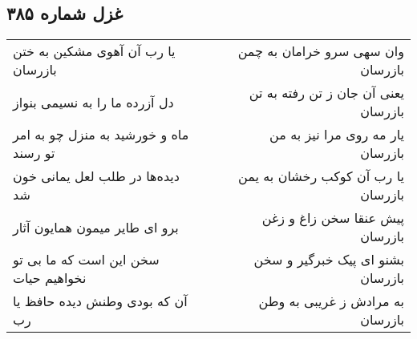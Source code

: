 \begin{center}
\section*{غزل شماره ۳۸۵}
\label{sec:sh385}
\begin{longtable}{l p{0.5cm} r}
یا رب آن آهوی مشکین به ختن بازرسان
&&
وان سهی سرو خرامان به چمن بازرسان
\\
دل آزرده ما را به نسیمی بنواز
&&
یعنی آن جان ز تن رفته به تن بازرسان
\\
ماه و خورشید به منزل چو به امر تو رسند
&&
یار مه روی مرا نیز به من بازرسان
\\
دیده‌ها در طلب لعل یمانی خون شد
&&
یا رب آن کوکب رخشان به یمن بازرسان
\\
برو ای طایر میمون همایون آثار
&&
پیش عنقا سخن زاغ و زغن بازرسان
\\
سخن این است که ما بی تو نخواهیم حیات
&&
بشنو ای پیک خبرگیر و سخن بازرسان
\\
آن که بودی وطنش دیده حافظ یا رب
&&
به مرادش ز غریبی به وطن بازرسان
\\
\end{longtable}
\end{center}
